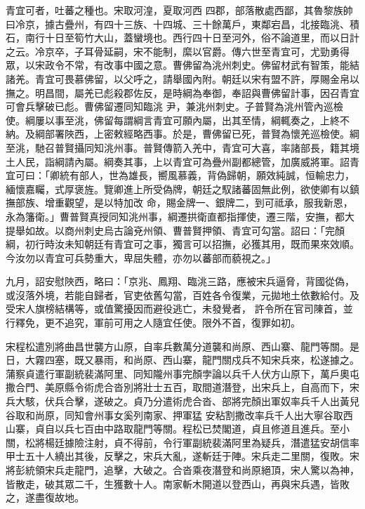 \begin{pinyinscope}
 青宜可者，吐蕃之種也。宋取河湟，夏取河西
 四郡，部落散處西鄙，其魯黎族帥曰冷京，據古疊州，有四十三族、十四城、三十餘萬戶，東鄰宕昌，北接臨洮、積石，南行十日至筍竹大山，蓋蠻境也。西行四十日至河外，俗不論道里，而以日計之云。冷京卒，子耳骨延嗣，宋不能制，縻以官爵。傳六世至青宜可，尤勁勇得眾，以宋政令不常，有改事中國之意。曹佛留為洮州刺史。佛留材武有智策，能結諸羌。青宜可畏慕佛留，以父呼之，請舉國內附。朝廷以宋有盟不許，厚賜金帛以撫之。明昌間，屬羌已彪殺郡佐反，是時綱為奉御，奉詔與曹佛留計事，因召青宜可會兵擊破已彪。曹佛留遷同知臨洮
 尹，兼洮州刺史。子普賢為洮州管內巡檢使。綱屢以事至洮，佛留每謂綱言青宜可願內屬，出其至情，綱輒奏之，上終不納。及綱部署陜西，上密敕經略西事。於是，曹佛留已死，普賢為懷羌巡檢使。綱至洮，馳召普賢攝同知洮州事。普賢傳箭入羌中，青宜可大喜，率諸部長，籍其境土人民，詣綱請內屬。綱奏其事，上以青宜可為疊州副都總管，加廣威將軍。詔青宜可曰：「卿統有部人，世為雄長，嚮風慕義，背偽歸朝，願效純誠，恒輸忠力，緬懷嘉矚，式厚褒旌。覽卿進上所受偽牌，朝廷之馭諸蕃固無此例，欲使卿有以鎮撫部族、增重觀望，是以特加改
 命，賜金牌一、銀牌二，到可祗承，服我新恩，永為籓衛。」曹普賢真授同知洮州事，綱遷拱衛直都指揮使，遷三階，安撫，都大提舉如故。以商州刺史烏古論兗州領、曹普賢押領、青宜可勾當。詔曰：「完顏綱，初行時汝未知朝廷有青宜可之事，獨言可以招撫，必獲其用，既而果來效順。今汝勿以青宜可兵勢重大，卑屈失體，亦勿以蕃部而藐視之。」



 九月，詔安慰陜西，略曰：「京兆、鳳翔、臨洮三路，應被宋兵逼脅，背國從偽，或沒落外境，若能自歸者，官吏依舊勾當，百姓各令復業，元拋地土依數給付。及受宋人旗榜結構等，或值驚擾因而避役逃亡，未發覺者，
 許令所在官司陳首，並行釋免，更不追究，軍前可用之人隨宜任使。限外不首，復罪如初。



 宋程松遣別將曲昌世襲方山原，自率兵數萬分道襲和尚原、西山寨、龍門等關。是日，大霧四塞，既又暴雨，和尚原、西山寨，龍門關戍兵不知宋兵來，松遂據之。蒲察貞遣行軍副統裴滿阿里、同知隴州事完顏孛論以兵千人伏方山原下，萬戶奧屯撒合門、美原縣令術虎合沓別將壯士五百，取間道潛登，出宋兵上，自高而下，宋兵大駭，伏兵合擊，遂破之。貞乃分遣術虎合沓、部將完顏出軍奴率兵千人出黃兒谷取和尚原，同知會州事女奚列南家、押軍猛
 安粘割撒改率兵千人出大寧谷取西山寨，貞自以兵七百由中路取龍門等關。程松已焚閣道，貞且修道且進兵。至小關，松將楊廷據險注射，貞不得前，令行軍副統裴滿阿里為疑兵，潛遣猛安胡信率甲士五十人繞出其後，反擊之，宋兵大亂，遂斬廷于陣。宋兵走二里關，復敗。宋將彭統領宋兵走龍門，追擊，大破之。合沓乘夜潛登和尚原絕頂，宋人驚以為神，皆散走，破其眾二千，生獲數十人。南家斬木開道以登西山，再與宋兵遇，皆敗之，遂盡復故地。




\end{pinyinscope}

